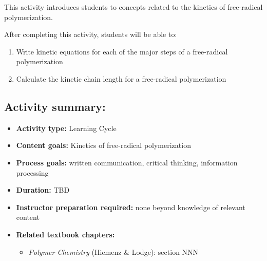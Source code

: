 %
%
%
%

\renewcommand{\figpath}{content}
\renewcommand{\labelbase}{FRPkinetics}

\begin{activity}

\begin{instructornotes}
	This activity introduces students to concepts related to the kinetics of free-radical polymerization.
	
	After completing this activity, students will be able to:
	\begin{enumerate}
		\item Write kinetic equations for each of the major steps of a free-radical polymerization
		\item Calculate the kinetic chain length for a free-radical polymerization
	\end{enumerate}
	
	\subsection*{Activity summary:}
	\begin{itemize}
		\item \textbf{Activity type:} Learning Cycle
		\item \textbf{Content goals:} Kinetics of free-radical polymerization
		\item \textbf{Process goals:} %
			written communication, critical thinking, information processing
		\item \textbf{Duration:} TBD
		\item \textbf{Instructor preparation required:} none beyond knowledge of relevant content
		\item \textbf{Related textbook chapters:}
			\begin{itemize}
				\item \emph{Polymer Chemistry} (Hiemenz \& Lodge): section NNN
			\end{itemize}
	\end{itemize}
	

\end{instructornotes}
\end{activity}
